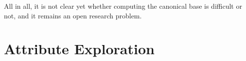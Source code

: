 All in all, it is not clear yet whether computing the canonical base is difficult or not,
and it remains an open research problem.

\section{Attribute Exploration}
\label{sec:attr-expl}

%
%


